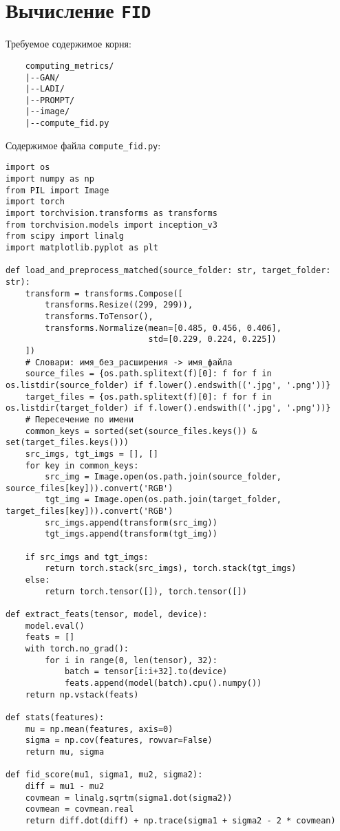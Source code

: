 \section{Вычисление \texttt{FID}}\label{app:fid}
Требуемое содержимое корня:
\begin{verbatim}
    computing_metrics/
    |--GAN/
    |--LADI/
    |--PROMPT/
    |--image/
    |--compute_fid.py
\end{verbatim}
Содержимое файла \texttt{compute\_fid.py}:
\begin{verbatim}
import os
import numpy as np
from PIL import Image
import torch
import torchvision.transforms as transforms
from torchvision.models import inception_v3
from scipy import linalg
import matplotlib.pyplot as plt

def load_and_preprocess_matched(source_folder: str, target_folder: str):
    transform = transforms.Compose([
        transforms.Resize((299, 299)),
        transforms.ToTensor(),
        transforms.Normalize(mean=[0.485, 0.456, 0.406],
                             std=[0.229, 0.224, 0.225])
    ])
    # Словари: имя_без_расширения -> имя_файла
    source_files = {os.path.splitext(f)[0]: f for f in os.listdir(source_folder) if f.lower().endswith(('.jpg', '.png'))}
    target_files = {os.path.splitext(f)[0]: f for f in os.listdir(target_folder) if f.lower().endswith(('.jpg', '.png'))}
    # Пересечение по имени
    common_keys = sorted(set(source_files.keys()) & set(target_files.keys()))
    src_imgs, tgt_imgs = [], []
    for key in common_keys:
        src_img = Image.open(os.path.join(source_folder, source_files[key])).convert('RGB')
        tgt_img = Image.open(os.path.join(target_folder, target_files[key])).convert('RGB')
        src_imgs.append(transform(src_img))
        tgt_imgs.append(transform(tgt_img))

    if src_imgs and tgt_imgs:
        return torch.stack(src_imgs), torch.stack(tgt_imgs)
    else:
        return torch.tensor([]), torch.tensor([])

def extract_feats(tensor, model, device):
    model.eval()
    feats = []
    with torch.no_grad():
        for i in range(0, len(tensor), 32):
            batch = tensor[i:i+32].to(device)
            feats.append(model(batch).cpu().numpy())
    return np.vstack(feats)

def stats(features):
    mu = np.mean(features, axis=0)
    sigma = np.cov(features, rowvar=False)
    return mu, sigma

def fid_score(mu1, sigma1, mu2, sigma2):
    diff = mu1 - mu2
    covmean = linalg.sqrtm(sigma1.dot(sigma2))
    covmean = covmean.real
    return diff.dot(diff) + np.trace(sigma1 + sigma2 - 2 * covmean)


\end{verbatim}

